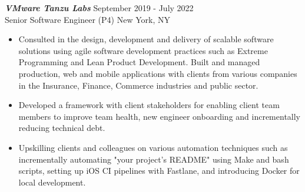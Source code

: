 {\sl \textbf{VMware Tanzu Labs}} \hfill September 2019 - July 2022 \\ Senior Software Engineer (P4) \hfill New York, NY
\begin{itemize}
    \item Consulted in the design, development and delivery of scalable software solutions using agile software development practices such as Extreme Programming and Lean Product Development. Built and managed production, web and mobile applications with clients from various companies in the Insurance, Finance, Commerce industries and public sector.
    \item Developed a framework with client stakeholders for enabling client team members to improve team health, new engineer onboarding and incrementally reducing technical debt.
    \item Upskilling clients and colleagues on various automation techniques such as incrementally automating "your project's README" using Make and bash scripts, setting up iOS CI pipelines with Fastlane, and introducing Docker for local development.
\end{itemize}
